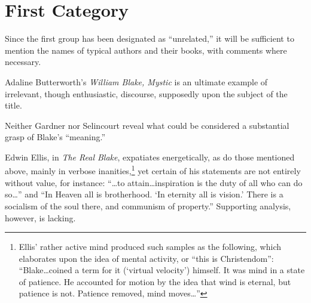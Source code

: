 \section{First Category}

Since the first group has been designated as \enquote{unrelated,}
it will be sufficient to mention the names of typical authors
and their books, with comments where necessary.

Adaline Butterworth's \emph{William Blake, Mystic}\supercite{butterworth:blake-mystic}
is an ultimate example of irrelevant, though enthusiastic, discourse, supposedly
upon the subject of the title.

Neither Gardner\supercite{gardner:vision-and-vesture}
nor Selincourt\supercite{de-selincourt:william-blake}
reveal what could be considered a substantial grasp of Blake's \enquote{meaning.}

Edwin Ellis, in \emph{The Real Blake},\supercite{ellis:real-blake} expatiates energetically, as
do those mentioned above, mainly in verbose inanities,\footnote{Ellis' rather active mind produced such samples as the following, which elaborates upon the idea of mental activity, or \enquote{this is Christendom}: \enquote{Blake\dots coined a term for it (\enquote*{virtual velocity}) himself. It was mind in a state of patience. He accounted for motion by the idea that wind is eternal, but patience is not. Patience removed, mind moves\dots}}
yet certain of his statements are not entirely without value, for instance: \enquote{\dots to attain\dots inspiration is
the duty of all who can do so\dots} and \enquote{In Heaven all is brotherhood. \enquote*{In eternity all is vision.} There is
a socialism of the soul there, and communism of property.} Supporting analysis, however, is lacking.


